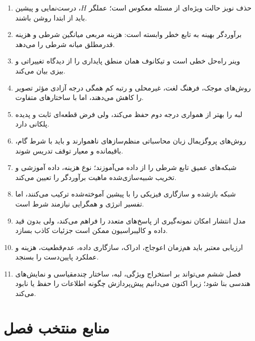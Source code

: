 \documentclass[12pt,openany,oneside]{book}
\begin{document}
\begin{summarybox}
\begin{enumerate}
\item حذف نویز حالت ویژه‌ای از مسئله معکوس است؛ عملگر \(H\)، درست‌نمایی و پیشین باید از ابتدا روشن باشند.
\item برآوردگر بهینه به تابع خطر وابسته است: هزینه مربعی میانگین شرطی و هزینه قدرمطلق میانه شرطی را می‌دهد.
\item وینر راه‌حل خطی  است و تیکانوف همان منطق پایداری را از دیدگاه تغییراتی و بیزی بیان می‌کند.
\item روش‌های موجک، فرهنگ لغت، غیرمحلی و رتبه کم همگی درجه آزادی مؤثر تصویر را کاهش می‌دهند، اما با ساختارهای متفاوت.
\item {} لبه را بهتر از همواری درجه دوم حفظ می‌کند، ولی فرض قطعه‌ای ثابت و پدیده پلکانی دارد.
\item روش‌های پروگزیمال زبان محاسباتی منظم‌سازهای ناهموارند و باید با شرط گام، باقیمانده و معیار توقف تدریس شوند.
\item شبکه‌های عمیق تابع شرطی را از داده می‌آموزند؛ نوع هزینه، داده آموزشی و تخریب شبیه‌سازی‌شده ماهیت برآوردگر را تعیین می‌کند.
\item شبکه بازشده و  سازگاری فیزیکی را با پیشین آموخته‌شده ترکیب می‌کنند، اما تفسیر انرژی و همگرایی نیازمند شرط است.
\item مدل انتشار امکان نمونه‌گیری از پاسخ‌های متعدد را فراهم می‌کند، ولی بدون قید داده و کالیبراسیون ممکن است جزئیات کاذب بسازد.
\item ارزیابی معتبر باید هم‌زمان اعوجاج، ادراک، سازگاری داده، عدم‌قطعیت، هزینه و عملکرد پایین‌دست را بسنجد.
\item فصل ششم می‌تواند بر استخراج ویژگی، لبه، ساختار چندمقیاسی و نمایش‌های هندسی بنا شود؛ زیرا اکنون می‌دانیم پیش‌پردازش چگونه اطلاعات را حفظ یا نابود می‌کند.
\end{enumerate}
\end{summarybox}

\backmatter
\chapter*{منابع منتخب فصل}
\end{document}
